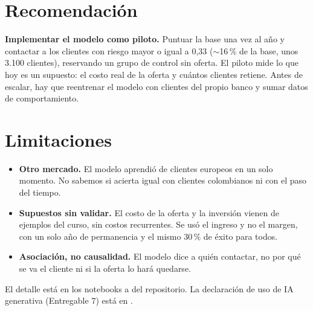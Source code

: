 \documentclass[11pt,a4paper]{article}
\newcommand{\apx}{\ensuremath{\sim}}                     %
\begin{document}
\section{Recomendación}

\begin{prioridad}
\textbf{Implementar el modelo como piloto.} Puntuar la base una vez al año y contactar a los clientes con riesgo
mayor o igual a 0,33 (\apx16\,\% de la base, unos 3.100 clientes), reservando un grupo de control sin oferta. El
piloto mide lo que hoy es un supuesto: el costo real de la oferta y cuántos clientes retiene. Antes de escalar, hay que
reentrenar el modelo con clientes del propio banco y sumar datos de comportamiento.
\end{prioridad}

\section{Limitaciones}

\begin{itemize}
  \item \textbf{Otro mercado.} El modelo aprendió de clientes europeos en un solo momento. No sabemos si acierta
    igual con clientes colombianos ni con el paso del tiempo.
  \item \textbf{Supuestos sin validar.} El costo de la oferta y la inversión vienen de ejemplos del curso, sin
    costos recurrentes. Se usó el ingreso y no el margen, con un solo año de permanencia y el mismo 30\,\% de
    éxito para todos.
  \item \textbf{Asociación, no causalidad.} El modelo dice a quién contactar, no por qué se va el cliente ni si la
    oferta lo hará quedarse.
\end{itemize}

{\small\color{gris}El detalle está en los notebooks  a  del repositorio. La
declaración de uso de IA generativa (Entregable 7) está en .}
\end{document}
